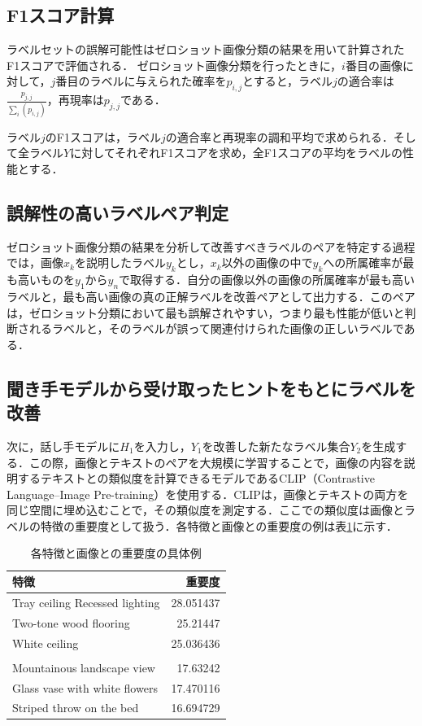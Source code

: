 \documentclass[a4paper,11pt]{jreport}
\begin{document}
\subsection{F1スコア計算}
ラベルセットの誤解可能性はゼロショット画像分類の結果を用いて計算されたF1スコアで評価される．
ゼロショット画像分類を行ったときに，$i$番目の画像に対して，$j$番目のラベルに与えられた確率を$p_{i,j}$とすると，ラベル$j$の適合率は$\frac{p_{j,j}}{\sum_i(p_{i,j})}$，再現率は$p_{j,j}$である．

ラベル$j$のF1スコアは，ラベル$j$の適合率と再現率の調和平均で求められる．そして全ラベル$Y$に対してそれぞれF1スコアを求め，全F1スコアの平均をラベルの性能とする．
\subsection{誤解性の高いラベルペア判定}
ゼロショット画像分類の結果を分析して改善すべきラベルのペアを特定する過程では，画像$x_k$を説明したラベル$y_k$とし，$x_k$以外の画像の中で$y_k$への所属確率が最も高いものを$y_1$から$y_n$で取得する．自分の画像以外の画像の所属確率が最も高いラベルと，最も高い画像の真の正解ラベルを改善ペアとして出力する．このペアは，ゼロショット分類において最も誤解されやすい，つまり最も性能が低いと判断されるラベルと，そのラベルが誤って関連付けられた画像の正しいラベルである．
\subsection{聞き手モデルから受け取ったヒントをもとにラベルを改善}
次に，話し手モデルに$H_1$を入力し，$Y_1$を改善した新たなラベル集合$Y_2$を生成する．この際，画像とテキストのペアを大規模に学習することで，画像の内容を説明するテキストとの類似度を計算できるモデルであるCLIP（Contrastive Language–Image Pre-training）を使用する．CLIPは，画像とテキストの両方を同じ空間に埋め込むことで，その類似度を測定する．ここでの類似度は画像とラベルの特徴の重要度として扱う．各特徴と画像との重要度の例は表\ref{tab:similarity_examples}に示す．

\begin{table}[ht]
\centering
\caption{各特徴と画像との重要度の具体例}
\label{tab:similarity_examples}
\begin{tabular}{@{}lr@{}}
\toprule
特徴 & 重要度 \\ \midrule
Tray ceiling Recessed lighting & 28.051437 \\
Two-tone wood flooring & 25.21447 \\
White ceiling & 25.036436 \\
\addlinespace %
\multicolumn{2}{c}{\dots} \\ %
\addlinespace %
Mountainous landscape view & 17.63242 \\
Glass vase with white flowers & 17.470116 \\
Striped throw on the bed & 16.694729 \\ \bottomrule
\end{tabular}
\end{table}
\end{document}
